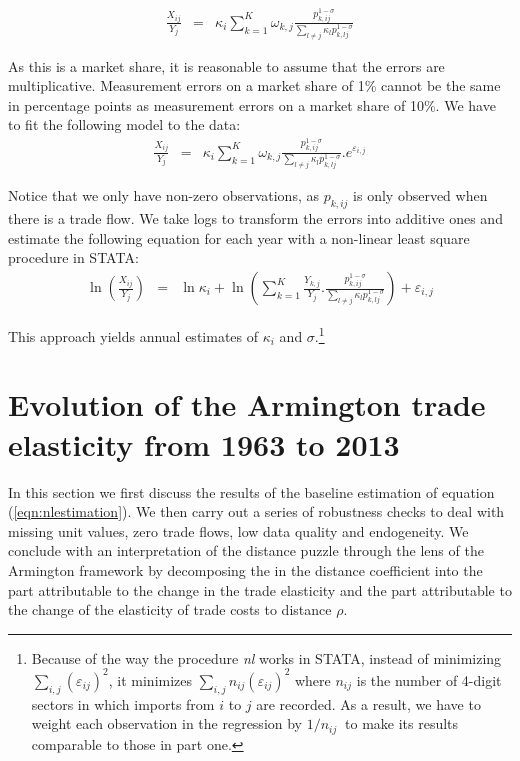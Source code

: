 \documentclass[12pt,twoside,a4paper,notitlepage]{article}
\begin{document}
\begin{eqnarray}
   \frac{{X}_{ij}}{Y_j} & = & {{\kappa }_{i}}\sum\limits_{k=1}^{K}{{{\omega }_{k,j}}}\frac{p_{k,ij}^{1-\sigma }}{\sum\limits_{l\ne j}{{{\kappa }_{l}}}p_{k,lj}^{1-\sigma }}  
\end{eqnarray}

As this is a market share, it is reasonable to assume that the errors are multiplicative.
Measurement errors on a market share of 1\% cannot be the same in percentage points as measurement errors on a market share of 10\%.
We have to fit the following model to the data:
\begin{eqnarray}
   \frac{{{X}_{ij}}}{{{Y}_{j}}} & = & {{\kappa }_{i}}\sum\limits_{k=1}^{K}{{{\omega }_{k,j}}}\frac{p_{k,ij}^{1-\sigma }}{\sum\limits_{l\ne j}{{{\kappa }_{l}}}p_{k,lj}^{1-\sigma }}.{{e}^{{{\varepsilon }_{i,j}}}}
  \end{eqnarray}

Notice that we only have non-zero observations, as ${{p}_{k,ij}}$ is only observed when there is a trade flow.
We take logs to transform the errors into additive ones and estimate the following equation for each year with a non-linear least square procedure in STATA:
\begin{eqnarray}
   \ln \left( \frac{{{X}_{ij}}}{{{Y}_{j}}} \right) & = & \ln {{\kappa }_{i}} +\ln \left( \sum\limits_{k=1}^{K}{\frac{{{Y}_{k,j}}}{{{Y}_{j}}}.}\frac{p_{k,ij}^{1-\sigma }}{\sum\limits_{l\ne j}{{{\kappa }_{l}}}p_{k,lj}^{1-\sigma }} \right) +{{\varepsilon }_{i,j}}
   \label{eqn:nlestimation}
   \end{eqnarray}
   
This approach yields annual estimates of ${{\kappa }_{i}}$ and $\sigma $.\footnote{Because of the way the procedure \textit{nl} works in STATA, instead of minimizing $\sum\limits_{i,j}{{{\left( {{\varepsilon }_{ij}} \right)}^{2}}}$, it minimizes $\sum\limits_{i,j}{{{n}_{ij}}{{\left( {{\varepsilon }_{ij}} \right)}^{2}}}$ where ${{n}_{ij}}$ is the number of 4-digit sectors in which imports from $i$ to $j$ are recorded.
As a result, we have to weight each observation in the regression by $1/{{n}_{ij}}\ $ to make its results comparable to those in part one.
}


\section{ Evolution of the Armington trade elasticity from 1963 to 2013}

In this section we first discuss the results of the baseline estimation of equation (\ref{eqn:nlestimation}). 
We then carry out a series of robustness checks to deal with missing unit values, zero trade flows, low data quality and endogeneity.
We conclude with an interpretation of the distance puzzle through the lens of the Armington framework by decomposing the  in the distance coefficient into the part attributable to the change in the trade elasticity and the part attributable to the change of the elasticity of trade costs to distance $ \rho $. 
\end{document}
